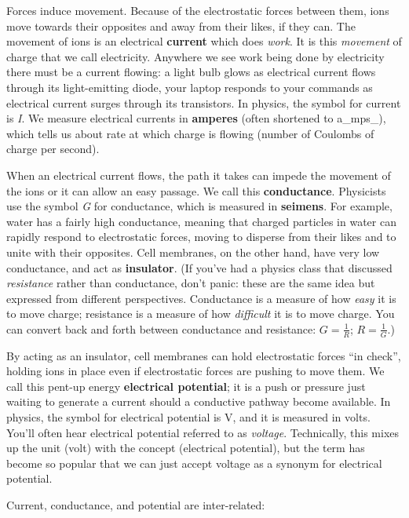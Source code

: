 \documentclass[
]{book}
\begin{document}
Forces induce movement. Because of the electrostatic forces between them, ions move towards their opposites and away from their likes, if they can. The movement of ions is an electrical \textbf{current} which does \emph{work}. It is this \emph{movement} of charge that we call electricity. Anywhere we see work being done by electricity there must be a current flowing: a light bulb glows as electrical current flows through its light-emitting diode, your laptop responds to your commands as electrical current surges through its transistors. In physics, the symbol for current is \emph{I}. We measure electrical currents in \textbf{amperes} (often shortened to a\_mps\_), which tells us about rate at which charge is flowing (number of Coulombs of charge per second).

When an electrical current flows, the path it takes can impede the movement of the ions or it can allow an easy passage. We call this \textbf{conductance}. Physicists use the symbol \emph{G} for conductance, which is measured in \textbf{seimens}. For example, water has a fairly high conductance, meaning that charged particles in water can rapidly respond to electrostatic forces, moving to disperse from their likes and to unite with their opposites. Cell membranes, on the other hand, have very low conductance, and act as \textbf{insulator}. (If you've had a physics class that discussed \emph{resistance} rather than conductance, don't panic: these are the same idea but expressed from different perspectives. Conductance is a measure of how \emph{easy} it is to move charge; resistance is a measure of how \emph{difficult} it is to move charge. You can convert back and forth between conductance and resistance: \(G = \frac{1}{R}\); \(R = \frac{1}{G}\).)

By acting as an insulator, cell membranes can hold electrostatic forces ``in check'', holding ions in place even if electrostatic forces are pushing to move them. We call this pent-up energy \textbf{electrical potential}; it is a push or pressure just waiting to generate a current should a conductive pathway become available. In physics, the symbol for electrical potential is V, and it is measured in volts. You'll often hear electrical potential referred to as \emph{voltage}. Technically, this mixes up the unit (volt) with the concept (electrical potential), but the term has become so popular that we can just accept voltage as a synonym for electrical potential.

Current, conductance, and potential are inter-related:
\end{document}

